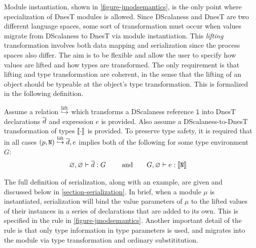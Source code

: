 Module instantiation, shown in \autoref{figure-jmodsemantics}, is the only point where
specialization of DnesT modules is allowed. Since DScalaness and DnesT are two different
language spaces, some sort of transformation must occur when values migrate from DScalaness to
DnesT via module instantiation. This \emph{lifting} transformation involves both data mapping
and serialization since the process spaces also differ. The aim is to be flexible and allow the
user to specify how values are lifted and how types are transformed. The only requirement is
that lifting and type transformation are coherent, in the sense that the lifting of an object
should be typeable at the object's type transformation. This is formalized in the following
definition.
\begin{definition}
\label{def-lifting}
Assume a relation $\overset{\text{lift}}{\hookrightarrow}$ which transforms a DScalaness reference $\texttt{l}$ into DnesT
declarations $\overline{d}$ and expression $e$ is provided. Also assume a DScalaness-to-DnesT
transformation of types $\llbracket \cdot \rrbracket$ is provided. To preserve type safety, it is required that
in all cases $\mathtt{(}p,\mathtt{N)} \overset{\text{lift}}{\hookrightarrow} \overline{d}, e$ implies both of the following for some type
environment $G$:
$$
\varnothing, \varnothing \vdash \overline{d} : G \qquad \text{ and} \qquad
 G, \varnothing \vdash e : \llbracket \texttt{N} \rrbracket 
$$
\end{definition}
The full definition of serialization, along with an example, are given and discussed below in
\autoref{section-serialization}. In brief, when a module $\mu$ is instantiated, serialization
will bind the value parameters of $\mu$ to the lifted values of their instances in a series of
declarations that are added to its own. This is specified in the  rule in
\autoref{figure-jmodsemantics}. Another important detail of the  rule is that
only type information in type parameters is used, and migrates into the module via type
transformation and ordinary substititution.

\jmodsemanticsfig

